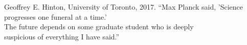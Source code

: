 \begin{prequote}[20pt]{Geoffrey E. Hinton, University of Toronto, 2017.}
    ``Max Planck said, 'Science progresses one funeral at a time.'\\
    The future depends on some graduate student who is deeply\\
    suspicious of everything I have said.''\\

\end{prequote}